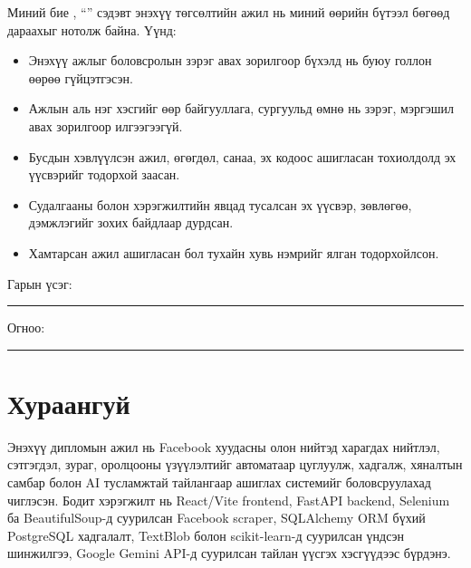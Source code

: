 \documentclass[
12pt,
oneside,
english,
onehalfspacing,
nolistspacing,
headsepline,
]{MUST-Thesis}
\newcommand{\authorshipname}{Зохиогч эрхийн хамгаалал}
\begin{document}
\begin{declaration}
\addchaptertocentry{\authorshipname}

\noindent Миний бие \shortname, ``\ttitle'' сэдэвт энэхүү төгсөлтийн ажил нь миний өөрийн бүтээл бөгөөд дараахыг нотолж байна. Үүнд:

\begin{itemize}
    \item Энэхүү ажлыг боловсролын зэрэг авах зорилгоор бүхэлд нь буюу голлон өөрөө гүйцэтгэсэн.
    \item Ажлын аль нэг хэсгийг өөр байгууллага, сургуульд өмнө нь зэрэг, мэргэшил авах зорилгоор илгээгээгүй.
    \item Бусдын хэвлүүлсэн ажил, өгөгдөл, санаа, эх кодоос ашигласан тохиолдолд эх үүсвэрийг тодорхой заасан.
    \item Судалгааны болон хэрэгжилтийн явцад тусалсан эх үүсвэр, зөвлөгөө, дэмжлэгийг зохих байдлаар дурдсан.
    \item Хамтарсан ажил ашигласан бол тухайн хувь нэмрийг ялган тодорхойлсон.
\end{itemize}
\bigskip

\noindent Гарын үсэг: \rule[-0.5em]{12.7em}{0.5pt}
\bigskip

\noindent Огноо: \rule[-0.5em]{15em}{0.5pt}
\end{declaration}

\clearpage

\chapter*{Хураангуй}

Энэхүү дипломын ажил нь Facebook хуудасны олон нийтэд харагдах нийтлэл, сэтгэгдэл, зураг, оролцооны үзүүлэлтийг автоматаар цуглуулж, хадгалж, хяналтын самбар болон AI тусламжтай тайлангаар ашиглах системийг боловсруулахад чиглэсэн. Бодит хэрэгжилт нь React/Vite frontend, FastAPI backend, Selenium ба BeautifulSoup-д суурилсан Facebook scraper, SQLAlchemy ORM бүхий PostgreSQL хадгалалт, TextBlob болон scikit-learn-д суурилсан үндсэн шинжилгээ, Google Gemini API-д суурилсан тайлан үүсгэх хэсгүүдээс бүрдэнэ.
\end{document}
